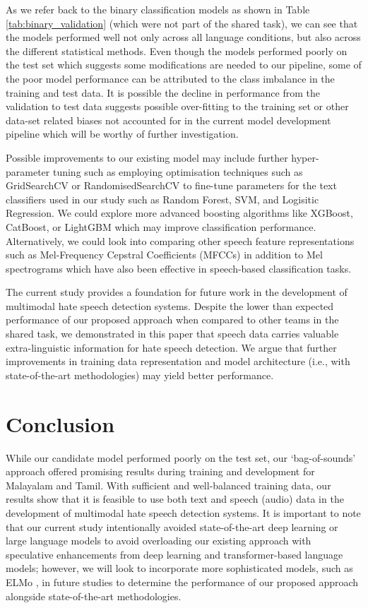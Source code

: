 \documentclass[11pt]{article}
\begin{document}
    As we refer back to the binary classification models as shown in Table \ref{tab:binary_validation} (which were not part of the shared task), we can see that the models performed well not only across all language conditions, but also across the different statistical methods. Even though the models performed poorly on the test set which suggests some modifications are needed to our pipeline, some of the poor model performance can be attributed to the class imbalance in the training and test data. It is possible the decline in performance from the validation to test data suggests possible over-fitting to the training set or other data-set related biases not accounted for in the current model development pipeline which will be worthy of further investigation.

    Possible improvements to our existing model may include further hyper-parameter tuning such as employing optimisation techniques such as GridSearchCV or RandomisedSearchCV to fine-tune parameters for the text classifiers used in our study such as Random Forest, SVM, and Logisitic Regression. We could explore more advanced boosting algorithms like XGBoost, CatBoost, or LightGBM which may improve classification performance. Alternatively, we could look into comparing other speech feature representations such as Mel-Frequency Cepstral Coefficients (MFCCs) in addition to Mel spectrograms which have also been effective in speech-based classification tasks. 

    The current study provides a foundation for future work in the development of multimodal hate speech detection systems. Despite the lower than expected performance of our proposed approach when compared to other teams in the shared task, we demonstrated in this paper that speech data carries valuable extra-linguistic information for hate speech detection. We argue that further improvements in training data representation and model architecture (i.e., with state-of-the-art methodologies) may yield better performance.

\section{Conclusion}
\label{sec:conclusion}

    While our candidate model performed poorly on the test set, our `bag-of-sounds' approach offered promising results during training and development for Malayalam and Tamil. With sufficient and well-balanced training data, our results show that it is feasible to use both text and speech (audio) data in the development of multimodal hate speech detection systems. It is important to note that our current study intentionally avoided state-of-the-art deep learning or large language models to avoid overloading our existing approach with speculative enhancements from deep learning and transformer-based language models; however, we will look to incorporate more sophisticated models, such as ELMo \citep{peters_deep_2018}, in future studies to determine the performance of our proposed approach alongside state-of-the-art methodologies.
\end{document}
